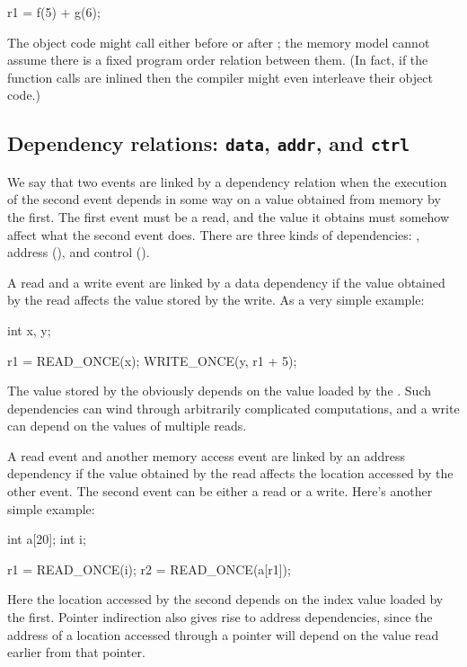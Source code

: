 \begin{VerbatimU}
	r1 = f(5) + g(6);
\end{VerbatimU}

The object code might call  either before or after ; the
memory model cannot assume there is a fixed program order relation
between them.
(In fact, if the function calls are inlined then the compiler might
even interleave their object code.)


\subsection{Dependency relations: \texttt{data}, \texttt{addr}, and \texttt{ctrl}}
\label{sec:docs:explanation:Dependency Relations: data, addr, and ctrl}

We say that two events are linked by a dependency relation when the
execution of the second event depends in some way on a value obtained
from memory by the first.
The first event must be a read, and the value it obtains must somehow
affect what the second event does.
There are three kinds of dependencies: , address (),
and control ().

A read and a write event are linked by a data dependency if the value
obtained by the read affects the value stored by the write.
As a very simple example:

\begin{VerbatimU}
	int x, y;

	r1 = READ_ONCE(x);
	WRITE_ONCE(y, r1 + 5);
\end{VerbatimU}

The value stored by the  obviously depends on the value
loaded by the .
Such dependencies can wind through arbitrarily complicated
computations, and a write can depend on the values of multiple reads.

A read event and another memory access event are linked by an address
dependency if the value obtained by the read affects the location
accessed by the other event.
The second event can be either a read or a write.
Here's another simple example:

\begin{VerbatimU}
	int a[20];
	int i;

	r1 = READ_ONCE(i);
	r2 = READ_ONCE(a[r1]);
\end{VerbatimU}

Here the location accessed by the second  depends on the
index value loaded by the first.
Pointer indirection also gives rise to address dependencies, since
the address of a location accessed through a pointer will depend on
the value read earlier from that pointer.

